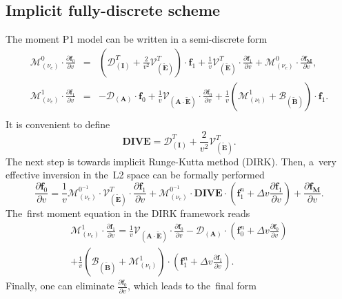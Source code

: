 \documentclass[preprint,12pt]{elsarticle}
\newcommand{\pdv}[2]{\frac{\partial{#1}}{\partial{#2}}}
\newcommand{\vect}[1]{\boldsymbol{#1}}
\newcommand{\matr}[1]{\mathbf{#1}}
\newcommand{\nue}{\nu_{e}}
\newcommand{\nutot}{\nu_{t}}
\newcommand{\vmag}{v}
\newcommand{\tE}{\vect{\tilde{E}}}
\newcommand{\tB}{\vect{\tilde{B}}}
\newcommand{\fM}{f_M}
\newcommand{\vfzero}{\vect{f}_0}
\newcommand{\fone}{\vect{f}_1}
\newcommand{\MI}{\matr{I}}
\newcommand{\MA}{\matr{A}}
\newcommand{\IM}{\boldsymbol{\mathcal{M}}}
\newcommand{\ID}{\boldsymbol{\mathcal{D}}}
\newcommand{\IV}{\boldsymbol{\mathcal{V}}}
\newcommand{\IB}{\boldsymbol{\mathcal{B}}}
\begin{document}
\subsection{Implicit fully-discrete scheme}\label{sec:impl_fullydiscrete_scheme}
The moment P1 model can be written in a semi-discrete form
\begin{eqnarray}
  \IM^0_{(\nue)} \cdot \pdv{\vfzero}{\vmag}  
  &=& 
  \left(\ID^T_{\left(\MI\right)}
  + \frac{2}{\vmag^2}\IV^T_{\left(\tE\right)}\right) \cdot \fone
  + \frac{1}{\vmag}\IV^T_{\left(\tE\right)} \cdot 
  \pdv{\fone}{\vmag} 
  + \IM^0_{(\nue)} \cdot \pdv{\vect{\fM}}{\vmag},  
  \nonumber \label{eq:semiM1hosf0} \\
  \IM^1_{(\nue)} \cdot \pdv{\fone}{\vmag}  
  &=& 
  - \ID_{\left(\MA\right)}\cdot \vfzero
  + \frac{1}{\vmag}\IV_{\left(\MA \cdot \tE\right)} \cdot
  \pdv{\vfzero}{\vmag}
  + \frac{1}{\vmag}\left(
  \IM^1_{\left( \nutot \right)} + \IB_{\left( \tB \right)}  
  \right) \cdot \fone.
  \nonumber\\
  \label{eq:semiM1hosf1}
\end{eqnarray}
It is convenient to define
\begin{equation}
  \matr{DIVE} = \ID^T_{\left(\MI\right)} 
  + \frac{2}{\vmag^2}\IV^T_{\left(\tE\right)}.
  \nonumber
\end{equation}
The next step is towards implicit Runge-Kutta method (DIRK).
Then, a~very effective inversion in the~L2 space can be formally performed
\begin{equation}
  \pdv{\vfzero}{\vmag}  
  = \frac{1}{\vmag}
  \IM^{0^{-1}}_{(\nue)} \cdot \IV^T_{\left(\tE\right)} \cdot 
  \pdv{\fone}{\vmag} 
  + \IM^{0^{-1}}_{(\nue)} \cdot \matr{DIVE}\cdot  
  \left(\fone^n 
  + \Delta\vmag\pdv{\fone}{\vmag}\right) 
  + \pdv{\vect{\fM}}{\vmag}.
  \label{eq:fullP1hosf0}
\end{equation}
The~first moment equation in the DIRK framework reads
\begin{multline}
  \IM^1_{(\nue)} \cdot \pdv{\fone}{\vmag}  
  = \frac{1}{\vmag}\IV_{\left(\MA \cdot \tE\right)} \cdot
  \pdv{\vfzero}{\vmag}
  - \ID_{\left(\MA\right)}\cdot \left(\vfzero^n 
  + \Delta\vmag\pdv{\vfzero}{\vmag}\right)\\ 
  + \frac{1}{\vmag}\left(\IB_{\left( \tB \right)} 
  + \IM^1_{\left( \nutot \right)}\right) 
  \cdot \left(\fone^n 
  + \Delta\vmag\pdv{\fone}{\vmag}\right).
  \label{eq:semiM1hosf1}
\end{multline}
Finally, one can eliminate $\pdv{\vfzero}{\vmag}$, 
which leads to the~final form
\end{document}
